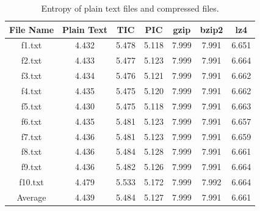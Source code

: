 \begin{table}[ht]
\centering
\begin{tabular}{ccccccc}
\hline
File Name & Plain Text & TIC & PIC & gzip & bzip2 & lz4 \\
\hline
f1.txt & 4.432 & 5.478 & 5.118 & 7.999 & 7.991 & 6.651 \\
f2.txt & 4.433 & 5.477 & 5.123 & 7.999 & 7.991 & 6.664 \\
f3.txt & 4.434 & 5.476 & 5.121 & 7.999 & 7.991 & 6.662 \\
f4.txt & 4.435 & 5.475 & 5.120 & 7.999 & 7.991 & 6.662 \\
f5.txt & 4.430 & 5.475 & 5.118 & 7.999 & 7.991 & 6.663 \\
f6.txt & 4.435 & 5.481 & 5.123 & 7.999 & 7.991 & 6.657 \\
f7.txt & 4.436 & 5.481 & 5.123 & 7.999 & 7.991 & 6.659 \\
f8.txt & 4.436 & 5.484 & 5.128 & 7.999 & 7.991 & 6.661 \\
f9.txt & 4.436 & 5.482 & 5.126 & 7.999 & 7.991 & 6.664 \\
f10.txt & 4.479 & 5.533 & 5.172 & 7.999 & 7.992 & 6.664 \\
Average & 4.439 & 5.484 & 5.127 & 7.999 & 7.991 & 6.661 \\
\hline
\end{tabular}
\caption{Entropy of plain text files and compressed files.}
\label{tab:entropy}
\end{table}
